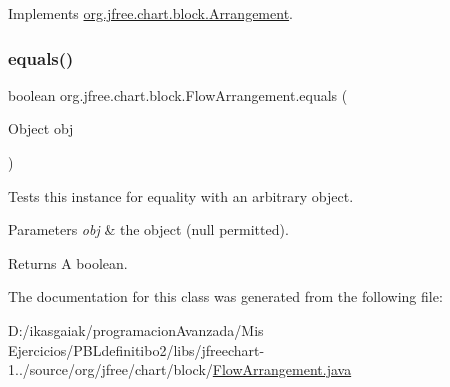 Implements \mbox{\hyperlink{interfaceorg_1_1jfree_1_1chart_1_1block_1_1_arrangement_a4db8248d65d1c074b7cf5ecc35d0f097}{org.\+jfree.\+chart.\+block.\+Arrangement}}.

\mbox{\label{classorg_1_1jfree_1_1chart_1_1block_1_1_flow_arrangement_a4887236e99024d30e6639f4352e7a937}} 
\subsubsection{\texorpdfstring{equals()}{equals()}}
{\footnotesize\ttfamily boolean org.\+jfree.\+chart.\+block.\+Flow\+Arrangement.\+equals (\begin{DoxyParamCaption}\item[{Object}]{obj }\end{DoxyParamCaption})}

Tests this instance for equality with an arbitrary object.


\begin{DoxyParams}{Parameters}
{\em obj} & the object ({\ttfamily null} permitted).\\
\hline
\end{DoxyParams}
\begin{DoxyReturn}{Returns}
A boolean. 
\end{DoxyReturn}


The documentation for this class was generated from the following file\+:\begin{DoxyCompactItemize}
\item 
D\+:/ikasgaiak/programacion\+Avanzada/\+Mis Ejercicios/\+P\+B\+Ldefinitibo2/libs/jfreechart-\/1../source/org/jfree/chart/block/\mbox{\hyperlink{_flow_arrangement_8java}{Flow\+Arrangement.\+java}}\end{DoxyCompactItemize}
